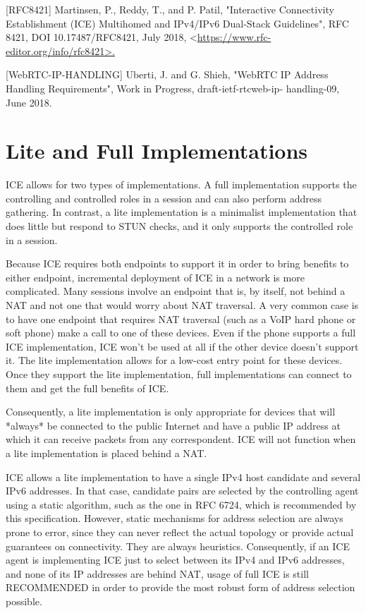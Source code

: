 \documentclass{article}
\begin{document}
[RFC8421]  Martinsen, P., Reddy, T., and P. Patil, "Interactive Connectivity Establishment (ICE) Multihomed and IPv4/IPv6 Dual-Stack Guidelines", RFC 8421, DOI 10.17487/RFC8421, July 2018, <\url{https://www.rfc-editor.org/info/rfc8421>.}

[WebRTC-IP-HANDLING] Uberti, J. and G. Shieh, "WebRTC IP Address Handling Requirements", Work in Progress, draft-ietf-rtcweb-ip- handling-09, June 2018.

\section{Lite and Full Implementations}

ICE allows for two types of implementations.  A full implementation supports the controlling and controlled roles in a session and can also perform address gathering.  In contrast, a lite implementation is a minimalist implementation that does little but respond to STUN checks, and it only supports the controlled role in a session.

Because ICE requires both endpoints to support it in order to bring benefits to either endpoint, incremental deployment of ICE in a network is more complicated.  Many sessions involve an endpoint that is, by itself, not behind a NAT and not one that would worry about NAT traversal.  A very common case is to have one endpoint that requires NAT traversal (such as a VoIP hard phone or soft phone) make a call to one of these devices.  Even if the phone supports a full ICE implementation, ICE won't be used at all if the other device doesn't support it.  The lite implementation allows for a low-cost entry point for these devices.  Once they support the lite implementation, full implementations can connect to them and get the full benefits of ICE.

Consequently, a lite implementation is only appropriate for devices that will *always* be connected to the public Internet and have a public IP address at which it can receive packets from any correspondent.  ICE will not function when a lite implementation is placed behind a NAT.

ICE allows a lite implementation to have a single IPv4 host candidate and several IPv6 addresses.  In that case, candidate pairs are selected by the controlling agent using a static algorithm, such as the one in RFC 6724, which is recommended by this specification. However, static mechanisms for address selection are always prone to error, since they can never reflect the actual topology or provide actual guarantees on connectivity.  They are always heuristics. Consequently, if an ICE agent is implementing ICE just to select between its IPv4 and IPv6 addresses, and none of its IP addresses are behind NAT, usage of full ICE is still RECOMMENDED in order to provide the most robust form of address selection possible.
\end{document}
